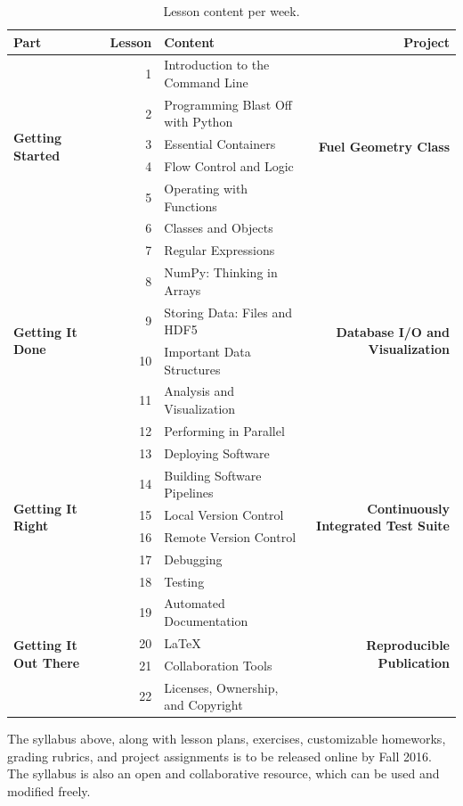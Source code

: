 \documentclass{anstrans}
\begin{document}
\begin{table}[t]
\centering
\begin{tabular}{|l|r|l|r|}
\hline
\textbf{Part} & \textbf{Lesson} & \textbf{Content} & \textbf{Project} \\
\hline
\multirow{6}{*}{\textbf{Getting Started}}
& 1 & Introduction to the Command Line
& \multirow{6}{*}{\textbf{Fuel Geometry Class}}\\
& 2 & Programming Blast Off with Python & \\
& 3 & Essential Containers & \\
& 4 & Flow Control and Logic & \\
& 5 & Operating with Functions & \\
& 6 & Classes and Objects & \\
\hline
\multirow{6}{*}{\textbf{Getting It Done}}
& 7 & Regular Expressions
& \multirow{6}{*}{\textbf{Database I/O and Visualization}}\\
& 8 & NumPy: Thinking in Arrays & \\
& 9 & Storing Data: Files and HDF5 & \\
& 10 & Important Data Structures & \\
& 11 & Analysis and Visualization & \\
& 12 & Performing in Parallel & \\
\hline
\multirow{6}{*}{\textbf{Getting It Right}}
& 13 & Deploying Software
& \multirow{6}{*}{\textbf{Continuously Integrated Test Suite}}\\
& 14 & Building Software Pipelines & \\
& 15 & Local Version Control & \\
& 16 & Remote Version Control & \\
& 17 & Debugging & \\
& 18 & Testing & \\
\hline
\multirow{4}{*}{\textbf{Getting It Out There}}
& 19 & Automated Documentation
& \multirow{4}{*}{\textbf{Reproducible Publication}}\\
& 20 & LaTeX & \\
& 21 & Collaboration Tools& \\
& 22 & Licenses, Ownership, and Copyright & \\
\hline
\end{tabular}
\label{tab:syllabus}
\caption{Lesson content per week.}
\end{table}


The syllabus above, along with lesson plans, exercises, customizable homeworks,
grading rubrics, and project assignments is to be released online by Fall 2016.
The syllabus is also an open and collaborative resource, which can be used
and modified freely.
\end{document}
